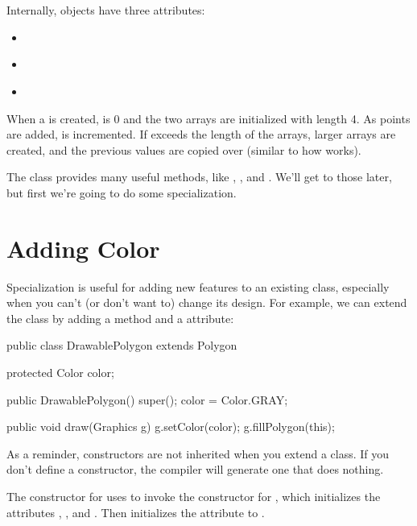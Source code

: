 Internally,  objects have three attributes:

\begin{itemize}

\item {} {\tt ~~~} 

\item {} {\tt ~} 

\item {} {\tt ~} 

\end{itemize}

When a  is created,  is 0 and the two arrays are initialized with length 4.
As points are added,  is incremented.
If  exceeds the length of the arrays, larger arrays are created, and the previous values are copied over (similar to how  works).

The  class provides many useful methods, like , , and .
We'll get to those later, but first we're going to do some specialization.


\section{Adding Color}

Specialization is useful for adding new features to an existing class, especially when you can't (or don't want to) change its design.
For example, we can extend the  class by adding a  method and a  attribute:

\begin{code}
public class DrawablePolygon extends Polygon {
    protected Color color;

    public DrawablePolygon() {
        super();
        color = Color.GRAY;
    }
    
    public void draw(Graphics g) {
        g.setColor(color);
        g.fillPolygon(this);
    }
}
\end{code}

As a reminder, constructors are not inherited when you extend a class.
If you don't define a constructor, the compiler will generate one that does nothing.

The constructor for  uses  to invoke the constructor for , which initializes the attributes , , and .
Then  initializes the  attribute to .

